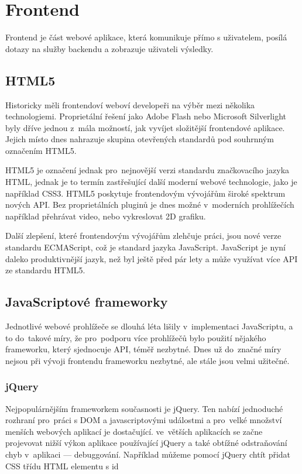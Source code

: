 \chapter{Frontend}
\label{chap:frontend}

Frontend je část webové aplikace, která komunikuje přímo s uživatelem, posílá dotazy na služby backendu a zobrazuje uživateli výsledky.

\section{HTML5}

Historicky měli frontendoví weboví developeři na výběr mezi několika technologiemi. Proprietální řešení jako Adobe Flash\cite{flash} nebo Microsoft Silverlight\cite{silverlight} byly dříve jednou z~mála možností, jak vyvíjet složitější frontendové aplikace. Jejich místo dnes nahrazuje skupina otevřených standardů pod souhrnným označením HTML5.

HTML5 je označení jednak pro~nejnovější verzi standardu značkovacího jazyka HTML\cite{html5}, jednak je to termín zastřešující další moderní webové technologie, jako je například CSS3\cite{css3}. HTML5 poskytuje frontendovým vývojářům široké spektrum nových API. Bez proprietálních pluginů je dnes možné v~moderních prohlížečích například přehrávat video, nebo vykreslovat 2D grafiku.

Další zlepšení, které frontendovým vývojářům zlehčuje práci, jsou nové verze standardu ECMAScript\cite{ecmascript}, což je standard jazyka JavaScript. JavaScript je nyní daleko produktivnější jazyk, než byl ještě před pár lety a může využívat více API ze standardu HTML5.

\section{JavaScriptové frameworky}

Jednotlivé webové prohlížeče se dlouhá léta lišily v~implementaci JavaScriptu, a to do~takové míry, že pro~podporu více prohlížečů bylo použití nějakého frameworku, který sjednocuje API, téměř nezbytné. Dnes už do~značné míry nejsou při vývoji frontendu frameworku nezbytné, ale stále jsou velmi užitečné.

\subsection{jQuery}
Nejpopulárnějším frameworkem současnosti je jQuery\cite{jquery}. Ten nabízí jednoduché rozhraní pro~práci s DOM a javascriptovými událostmi a pro~velké množství menších webových aplikací je dostačující. ve~větších aplikacích se začne projevovat nižší výkon aplikace používající jQuery a také obtížné odstraňování chyb v~aplikaci --- debuggování. Například můžeme pomocí jQuery chtít přidat CSS třídu  HTML elementu s id 

